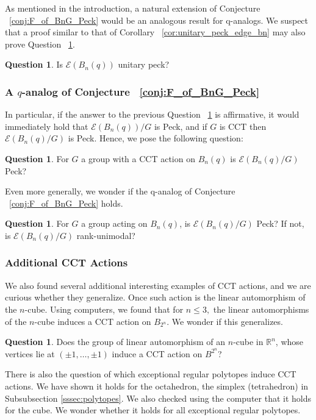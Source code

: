 \documentclass[10 pt]{amsart}
\theoremstyle{plain}
\theoremstyle{definition}
\newtheorem{question}[thm]{Question}
\theoremstyle{remark}
\numberwithin{equation}{section}
\newcommand\sssec{\subsubsection}
\newcommand\BR{{\mathbb R}}
\begin{document}
As mentioned in the introduction, a natural extension of Conjecture ~\ref{conj:F_of_BnG_Peck} would be an analogous result for q-analogs. We suspect that a proof similar to that of Corollary ~\ref{cor:unitary_peck_edge_bn} may also prove Question ~\ref{question:unitary_peck_q_edge}.

\begin{question}
\label{question:unitary_peck_q_edge}
Is $\mathcal E(B_n(q))$ unitary peck?
\end{question}

\sssec{A $q$-analog of Conjecture ~\ref{conj:F_of_BnG_Peck}}

In particular, if the answer to the previous Question ~\ref{question:unitary_peck_q_edge} is affirmative, it would immediately hold that $\mathcal E(B_n(q))/G$ is Peck, and if $G$ is CCT then $\mathcal E(B_n(q)/G)$ is Peck. Hence, we pose the following question: 

\begin{question}
For $G$ a group with a CCT action on $B_n(q)$ is $\mathcal E(B_n(q)/G)$ Peck?
\end{question}

Even more generally, we wonder if the q-analog of Conjecture ~\ref{conj:F_of_BnG_Peck} holds.

\begin{question}
For $G$ a group acting on $B_n(q)$, is $\mathcal E(B_n(q)/G)$ Peck? If not, is $\mathcal E(B_n(q)/G)$ rank-unimodal?
\end{question}

\sssec{Additional CCT Actions}

We also found several additional interesting examples of CCT actions, and we are curious whether they generalize. Once such action is the linear automorphism of the $n$-cube. Using computers, we found that for $n \leq 3,$ the linear automorphisms of the $n$-cube induces a CCT action on $B_{2^n}$. We wonder if this generalizes.

\begin{question}
\label{question:cube_cct}
Does the group of linear automorphism of an $n$-cube in $\BR^n$, whose vertices lie at $(\pm 1, \ldots, \pm 1)$ induce a CCT action on $B^{2^n}$?
\end{question}

There is also the question of which exceptional regular polytopes induce CCT actions. We have shown it holds for the octahedron, the simplex (tetrahedron) in Subsubsection \ref{sssec:polytopes}. We also checked using the computer that it holds for the cube. We wonder whether it holds for all exceptional regular polytopes.
\end{document}
